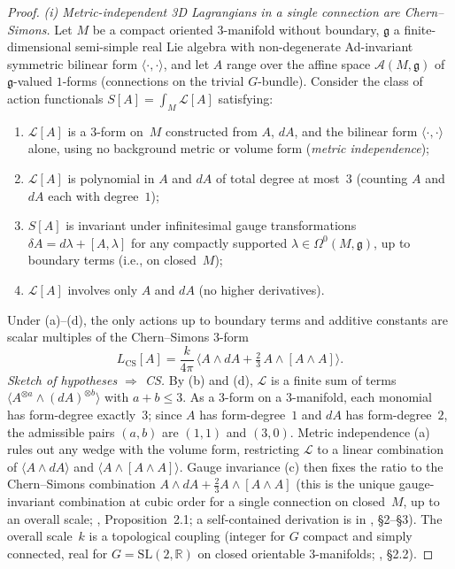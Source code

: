 \begin{proof}
\emph{(i) Metric-independent 3D Lagrangians in a single
connection are Chern--Simons.}
Let $M$ be a compact oriented $3$-manifold without
boundary, $\mathfrak{g}$ a finite-dimensional
semi-simple real Lie algebra with
non-degenerate Ad-invariant symmetric bilinear form
$\langle\cdot,\cdot\rangle$, and let $A$ range over the
affine space $\mathcal{A}(M,\mathfrak{g})$ of
$\mathfrak{g}$-valued $1$-forms (connections on the
trivial $G$-bundle).  Consider the class of action
functionals $S[A] = \int_M \mathcal{L}[A]$ satisfying:
\begin{enumerate}[label=(\alph*),leftmargin=*,topsep=0pt,itemsep=0pt]
\item $\mathcal{L}[A]$ is a $3$-form on~$M$
  constructed from $A$, $dA$, and the bilinear form
  $\langle\cdot,\cdot\rangle$ alone, using no background
  metric or volume form (\emph{metric independence});
\item $\mathcal{L}[A]$ is polynomial in $A$ and $dA$
  of total degree at most~$3$ (counting $A$ and $dA$
  each with degree~$1$);
\item $S[A]$ is invariant under infinitesimal gauge
  transformations $\delta A = d\lambda + [A, \lambda]$
  for any compactly supported
  $\lambda \in \Omega^0(M,\mathfrak{g})$, up to boundary
  terms (i.e., on closed~$M$);
\item $\mathcal{L}[A]$ involves only $A$ and $dA$
  (no higher derivatives).
\end{enumerate}
Under (a)--(d), the only actions up to boundary terms
and additive constants are scalar multiples of the
Chern--Simons $3$-form
\begin{equation}\label{eq:cs-form}
  L_{\mathrm{CS}}[A]
  = \frac{k}{4\pi}\,
    \bigl\langle A \wedge dA
      + \tfrac{2}{3}\, A \wedge [A \wedge A]\bigr\rangle.
\end{equation}
\emph{Sketch of hypotheses $\Rightarrow$ CS.}
By (b) and (d), $\mathcal{L}$ is a finite sum of terms
$\langle A^{\otimes a} \wedge (dA)^{\otimes b}\rangle$
with $a + b \le 3$.  As a $3$-form on a $3$-manifold,
each monomial has form-degree exactly~$3$; since $A$
has form-degree~$1$ and $dA$ has form-degree~$2$, the
admissible pairs $(a, b)$ are $(1, 1)$ and $(3, 0)$.
Metric independence (a) rules out any wedge with the
volume form, restricting $\mathcal{L}$ to a linear
combination of
$\langle A \wedge dA \rangle$ and
$\langle A \wedge [A \wedge A]\rangle$.
Gauge invariance (c) then fixes the ratio to the
Chern--Simons combination $A \wedge dA
+ \tfrac{2}{3} A \wedge [A \wedge A]$ (this is the
unique gauge-invariant combination at cubic order for a
single connection on closed~$M$, up to an overall scale;
\citealt{DijkgraafWitten1990}, Proposition~2.1; a
self-contained derivation is in
\citealt{FreedQuinn1993}, \S2--\S3).
The overall scale~$k$ is a topological coupling (integer
for $G$ compact and simply connected, real for
$G = \mathrm{SL}(2,\mathbb{R})$ on closed orientable
$3$-manifolds; \citealt{Witten1989}, \S2.2).


\end{proof}
